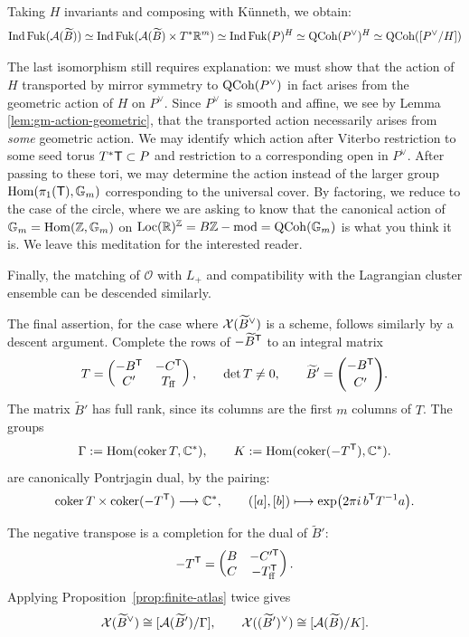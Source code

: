 \documentclass[12pt, letter]{amsart}
\DeclareMathOperator{\Ind}{Ind}
\DeclareMathOperator{\Fuk}{Fuk}
\theoremstyle{definition}
\begin{document}
Taking $H$ invariants and composing with K\"unneth, we obtain: 
$$\Ind \Fuk ( \cA(\widetilde B)) \simeq \Ind \Fuk ( \cA(\widetilde B) \times T^* \bR^m)
\simeq \Ind \Fuk(P)^H \simeq \QCoh(P^\vee)^H \simeq \QCoh([P^\vee / H])
$$ 



The last isomorphism still requires explanation: we must show that the action of $H$ transported by mirror symmetry to $\operatorname{QCoh}(P^\vee)$ in fact arises from the geometric action of $H$ on $P^\vee$.  
Since $P^\vee$ is smooth and affine, we see by Lemma \ref{lem:gm-action-geometric}, that the transported action necessarily arises from {\em some} geometric action.  
We may identify which action after Viterbo restriction to some seed torus $T^* \mathsf T \subset P$ and restriction to a corresponding open in $P^\vee$.  After passing to these tori, we may determine the action instead of the larger group $\operatorname{Hom}(\pi_1(\mathsf T), \mathbb{G}_m)$ corresponding to the universal cover.  By factoring, we reduce to the case of the circle, where we are asking to know that the canonical action of $\mathbb{G}_m = \operatorname{Hom}(\mathbb{Z}, \mathbb{G}_m)$ on $\operatorname{Loc}(\mathbb R)^{\mathbb{Z}} = B\mathbb{Z}-\operatorname{mod} = \operatorname{QCoh}(\mathbb{G}_m)$ is what you think it is.  We leave this meditation for the interested reader. 

Finally, the matching of $\mathcal{O}$ with $L_+$ and compatibility with the Lagrangian cluster ensemble can be descended similarly. 

The final assertion, for the case where $\mathcal{X}(\widetilde B^\vee)$ is a scheme, follows similarly by a descent argument. 
Complete the rows of $-\widetilde B^{\mathsf T}$ to an integral matrix
\begin{equation}\label{eq:reverse-skew-completion}
 T=\begin{pmatrix}-B^{\mathsf T}&-C^{\mathsf T}\\C'&T_{\mathrm{ff}}\end{pmatrix},
 \qquad \det T\ne0,
 \qquad \widetilde B'=\binom{-B^{\mathsf T}}{C'}.
\end{equation}
The matrix $\widetilde B'$ has full rank, since its columns are the first $m$ columns of $T$.
The groups
\[
 \Gamma:=\operatorname{Hom}(\operatorname{coker} T,\mathbb{C}^*),\qquad
 K:=\operatorname{Hom}(\operatorname{coker}(-T^{\mathsf T}),\mathbb{C}^*).
\]
are canonically Pontrjagin dual, by the pairing:
\[
 \operatorname{coker} T\times\operatorname{coker}(-T^{\mathsf T})\longrightarrow\mathbb{C}^*,\qquad
 ([a],[b])\longmapsto\exp\bigl(2\pi i\,b^{\mathsf T}T^{-1}a\bigr).
\]

The negative transpose is a completion for the dual of $\widetilde B'$:
\[
 -T^{\mathsf T}=\begin{pmatrix}B&-C'^{\mathsf T}\\C&-T_{\mathrm{ff}}^{\mathsf T}\end{pmatrix}.
\]
Applying Proposition~\ref{prop:finite-atlas} twice gives
\begin{equation}\label{eq:reverse-skew-quotients}
 \mathcal{X}(\widetilde{B}^\vee) \cong[\mathcal{A}(\widetilde B')/\Gamma],\qquad \mathcal{X}((\widetilde B')^\vee) \cong[\mathcal{A}(\widetilde{B})/K].
\end{equation}
\end{document}
